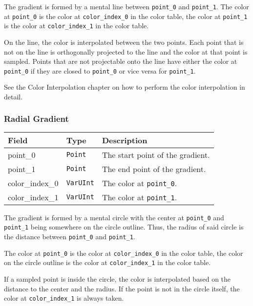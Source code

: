 \documentclass[]{article}
\begin{document}
The gradient is formed by a mental line between \texttt{point\_0} and
\texttt{point\_1}. The color at \texttt{point\_0} is the color at
\texttt{color\_index\_0} in the color table, the color at
\texttt{point\_1} is the color at \texttt{color\_index\_1} in the color
table.

On the line, the color is interpolated between the two points.
Each point that is not on the line is orthogonally projected to the line
and the color at that point is sampled. Points that are not projectable
onto the line have either the color at \texttt{point\_0} if they are
closed to \texttt{point\_0} or vice versa for \texttt{point\_1}.

See the \hypertarget{color-interpolation}{Color Interpolation} chapter on how to perform the color interpolation in detail.

\hypertarget{radial-gradient}{\subsubsection{Radial Gradient}\label{radial-gradient}}

\begin{longtable}[]{@{}p{1in}p{1in}p{4in}@{}}
\toprule
Field & Type & Description \\
\midrule
\endhead
point\_0        & \texttt{Point}   & The start point of the gradient. \\
point\_1        & \texttt{Point}   & The end point of the gradient. \\
color\_index\_0 & \texttt{VarUInt} & The color at \texttt{point\_0}. \\
color\_index\_1 & \texttt{VarUInt} & The color at \texttt{point\_1}. \\
\bottomrule
\end{longtable}

The gradient is formed by a mental circle with the center at
\texttt{point\_0} and \texttt{point\_1} being somewhere on the circle
outline. Thus, the radius of said circle is the distance between
\texttt{point\_0} and \texttt{point\_1}.

The color at \texttt{point\_0} is the color at \texttt{color\_index\_0}
in the color table, the color on the circle outline is the color at
\texttt{color\_index\_1} in the color table.

If a sampled point is inside the circle, the color is interpolated based
on the distance to the center and the radius. If the point is
not in the circle itself, the color at \texttt{color\_index\_1} is
always taken.
\end{document}
